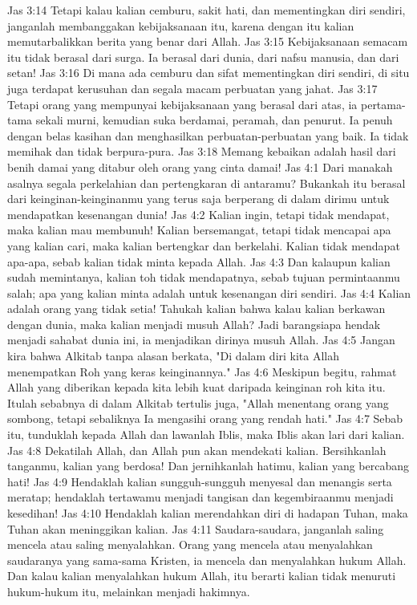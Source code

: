 Jas 3:14  Tetapi kalau kalian cemburu, sakit hati, dan mementingkan diri sendiri, janganlah membanggakan kebijaksanaan itu, karena dengan itu kalian memutarbalikkan berita yang benar dari Allah.
Jas 3:15  Kebijaksanaan semacam itu tidak berasal dari surga. Ia berasal dari dunia, dari nafsu manusia, dan dari setan!
Jas 3:16  Di mana ada cemburu dan sifat mementingkan diri sendiri, di situ juga terdapat kerusuhan dan segala macam perbuatan yang jahat.
Jas 3:17  Tetapi orang yang mempunyai kebijaksanaan yang berasal dari atas, ia pertama-tama sekali murni, kemudian suka berdamai, peramah, dan penurut. Ia penuh dengan belas kasihan dan menghasilkan perbuatan-perbuatan yang baik. Ia tidak memihak dan tidak berpura-pura.
Jas 3:18  Memang kebaikan adalah hasil dari benih damai yang ditabur oleh orang yang cinta damai!
Jas 4:1  Dari manakah asalnya segala perkelahian dan pertengkaran di antaramu? Bukankah itu berasal dari keinginan-keinginanmu yang terus saja berperang di dalam dirimu untuk mendapatkan kesenangan dunia!
Jas 4:2  Kalian ingin, tetapi tidak mendapat, maka kalian mau membunuh! Kalian bersemangat, tetapi tidak mencapai apa yang kalian cari, maka kalian bertengkar dan berkelahi. Kalian tidak mendapat apa-apa, sebab kalian tidak minta kepada Allah.
Jas 4:3  Dan kalaupun kalian sudah memintanya, kalian toh tidak mendapatnya, sebab tujuan permintaanmu salah; apa yang kalian minta adalah untuk kesenangan diri sendiri.
Jas 4:4  Kalian adalah orang yang tidak setia! Tahukah kalian bahwa kalau kalian berkawan dengan dunia, maka kalian menjadi musuh Allah? Jadi barangsiapa hendak menjadi sahabat dunia ini, ia menjadikan dirinya musuh Allah.
Jas 4:5  Jangan kira bahwa Alkitab tanpa alasan berkata, "Di dalam diri kita Allah menempatkan Roh yang keras keinginannya."
Jas 4:6  Meskipun begitu, rahmat Allah yang diberikan kepada kita lebih kuat daripada keinginan roh kita itu. Itulah sebabnya di dalam Alkitab tertulis juga, "Allah menentang orang yang sombong, tetapi sebaliknya Ia mengasihi orang yang rendah hati."
Jas 4:7  Sebab itu, tunduklah kepada Allah dan lawanlah Iblis, maka Iblis akan lari dari kalian.
Jas 4:8  Dekatilah Allah, dan Allah pun akan mendekati kalian. Bersihkanlah tanganmu, kalian yang berdosa! Dan jernihkanlah hatimu, kalian yang bercabang hati!
Jas 4:9  Hendaklah kalian sungguh-sungguh menyesal dan menangis serta meratap; hendaklah tertawamu menjadi tangisan dan kegembiraanmu menjadi kesedihan!
Jas 4:10  Hendaklah kalian merendahkan diri di hadapan Tuhan, maka Tuhan akan meninggikan kalian.
Jas 4:11  Saudara-saudara, janganlah saling mencela atau saling menyalahkan. Orang yang mencela atau menyalahkan saudaranya yang sama-sama Kristen, ia mencela dan menyalahkan hukum Allah. Dan kalau kalian menyalahkan hukum Allah, itu berarti kalian tidak menuruti hukum-hukum itu, melainkan menjadi hakimnya.
